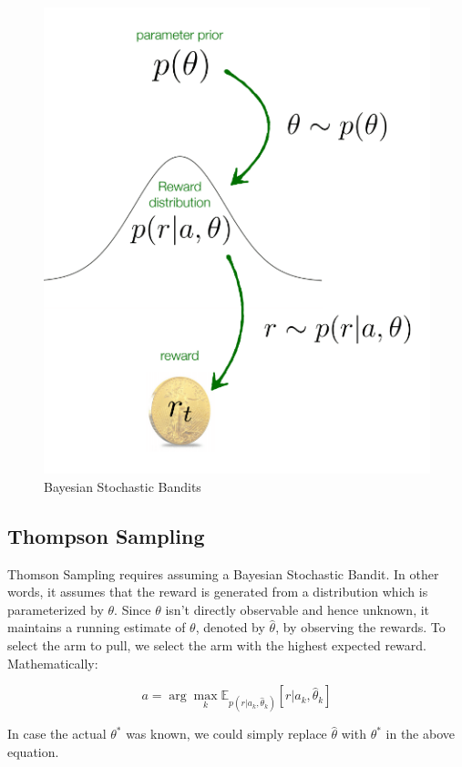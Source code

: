 \documentclass[11pt]{article}
\begin{document}
\normalfont
\begin{figure}[t]
    \centering
    \includegraphics[scale=0.4]{images/bayesian_stochastic_bandits.png}
    \caption{Bayesian Stochastic Bandits}
    \label{fig:bayesian_bandits}
\end{figure}


\subsection{Thompson Sampling}

Thomson Sampling requires assuming a Bayesian Stochastic Bandit. In other words, it assumes that the reward is generated from a distribution which is parameterized by $\theta$. Since $\theta$ isn't directly observable and hence unknown, it maintains a running estimate of $\theta$, denoted by $\hat{\theta}$, by observing the rewards. To select the arm to pull, we select the arm with the highest expected reward. Mathematically:

$$a = \arg \max_k \mathbb{E}_{p(r|a_k, \hat{\theta}_k)}\left[r|a_k, \hat{\theta}_k\right]$$

In case the actual $\theta^*$ was known, we could simply replace $\hat{\theta}$ with $\theta^*$ in the above equation.
\end{document}
